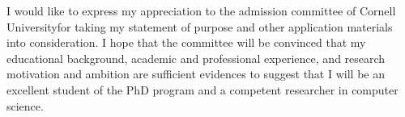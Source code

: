 \documentclass[a4paper,10pt]{report}
\newcommand{\university}{Cornell University}
\begin{document}
\vspace{0.2cm}
I would like to express my appreciation to the admission committee of \university \space for taking my statement of purpose and other application materials into consideration. I hope that the committee will be convinced that my educational background, academic and professional experience, and research motivation and ambition are sufficient evidences to suggest that I will be an excellent student of the PhD program and a competent researcher in computer science.
\end{document}
